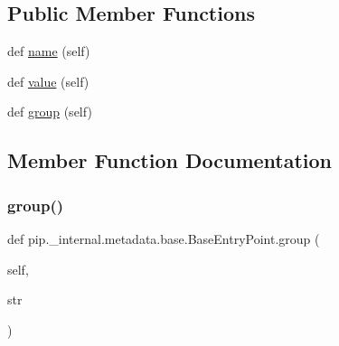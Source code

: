\subsection*{Public Member Functions}
\begin{DoxyCompactItemize}
\item 
def \hyperlink{classpip_1_1__internal_1_1metadata_1_1base_1_1BaseEntryPoint_aaa2abb8ead9f684fe1eb47f5dd28a997}{name} (self)
\item 
def \hyperlink{classpip_1_1__internal_1_1metadata_1_1base_1_1BaseEntryPoint_a95d065b52c014ba8a30cb144aa3e8920}{value} (self)
\item 
def \hyperlink{classpip_1_1__internal_1_1metadata_1_1base_1_1BaseEntryPoint_a7d39568feff09a2d04f0a644b291700e}{group} (self)
\end{DoxyCompactItemize}


\subsection{Member Function Documentation}
\mbox{\label{classpip_1_1__internal_1_1metadata_1_1base_1_1BaseEntryPoint_a7d39568feff09a2d04f0a644b291700e}} 
\subsubsection{\texorpdfstring{group()}{group()}}
{\footnotesize\ttfamily def pip.\+\_\+internal.\+metadata.\+base.\+Base\+Entry\+Point.\+group (\begin{DoxyParamCaption}\item[{}]{self,  }\item[{}]{str }\end{DoxyParamCaption})}

\mbox{\label{classpip_1_1__internal_1_1metadata_1_1base_1_1BaseEntryPoint_aaa2abb8ead9f684fe1eb47f5dd28a997}} 
